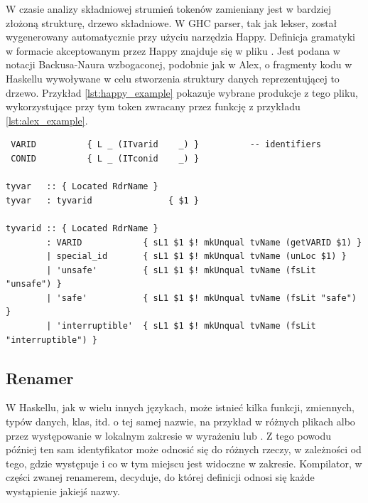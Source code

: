 W czasie analizy składniowej strumień tokenów zamieniany jest w bardziej złożoną
strukturę, drzewo składniowe. W GHC parser, tak jak lekser, został wygenerowany
automatycznie przy użyciu narzędzia Happy. Definicja gramatyki w formacie akceptowanym
przez Happy znajduje się w pliku . Jest podana w notacji Backusa-Naura
wzbogaconej, podobnie jak w Alex, o fragmenty kodu w Haskellu wywoływane w celu
stworzenia struktury danych reprezentującej to drzewo\cite{DocsHappy}. Przykład
\ref{lst:happy_example} pokazuje wybrane produkcje z tego pliku, wykorzystujące
przy tym token  zwracany przez funkcję  z przykładu
\ref{lst:alex_example}.
{
\begin{lstlisting}[float,label={lst:happy_example},
                   caption={Wycinki z pliku \code{Parser.y} z produkcjami odpowiadającymi za zmienne typów, wykorzystujące tokeny, których dotyczył przykład \ref{lst:alex_example}.}]
%token
 VARID          { L _ (ITvarid    _) }          -- identifiers
 CONID          { L _ (ITconid    _) }

tyvar   :: { Located RdrName }
tyvar   : tyvarid               { $1 }

tyvarid :: { Located RdrName }
        : VARID            { sL1 $1 $! mkUnqual tvName (getVARID $1) }
        | special_id       { sL1 $1 $! mkUnqual tvName (unLoc $1) }
        | 'unsafe'         { sL1 $1 $! mkUnqual tvName (fsLit "unsafe") }
        | 'safe'           { sL1 $1 $! mkUnqual tvName (fsLit "safe") }
        | 'interruptible'  { sL1 $1 $! mkUnqual tvName (fsLit "interruptible") }
\end{lstlisting}

\subsection{Renamer}\label{sec:renamer}

W Haskellu, jak w wielu innych językach, może istnieć kilka funkcji, zmiennych,
typów danych, klas, itd. o tej samej nazwie, na przykład w różnych plikach albo
przez występowanie w lokalnym zakresie w wyrażeniu  lub
. Z tego powodu później ten sam identyfikator może odnosić się do
różnych rzeczy, w zależności od tego, gdzie występuje i co w tym miejscu jest
widoczne w zakresie. Kompilator, w części zwanej renamerem, decyduje, do
której definicji odnosi się każde wystąpienie jakiejś nazwy.

}
